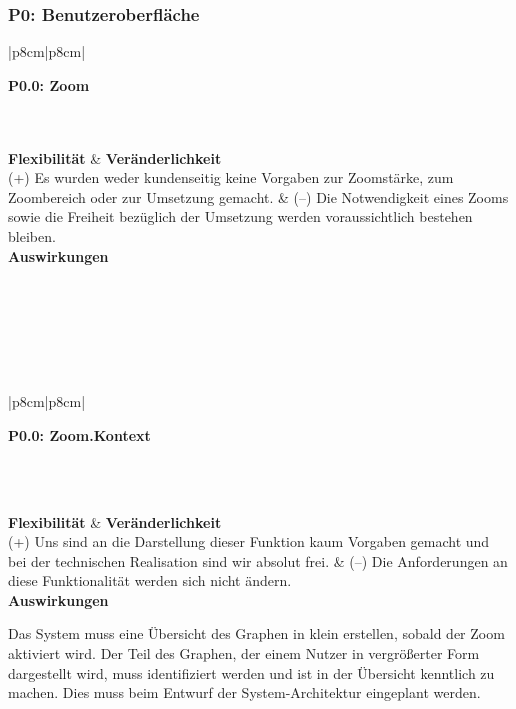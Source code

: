 \documentclass[enabledeprecatedfontcommands,fontsize=11pt,paper=a4,twoside]{scrartcl}
\newcounter{one}
\newcounter{two}[one]
\newcommand{\tone}{0\theone}
\newcommand{\one}{\stepcounter{one}0\theone}
\newcommand{\two}{\stepcounter{two}0\thetwo}
\newcommand\s{\rule{0pt}{4ex}}
\begin{document}
\subsubsection*{\hypertarget{dd}{P\one}: Benutzeroberfläche}
\begin{tabular} {|p{8cm}|p{8cm}|}
	\hline
	 {\parbox{16cm}{\textbf{\hypertarget{ee}{P\tone.\two}: Zoom}} }\\ \hline\hline
	\\ \hline
	\textbf{Flexibilität}  & \textbf{Veränderlichkeit} \\
	(+) Es wurden weder kundenseitig keine Vorgaben zur Zoomstärke, zum Zoombereich oder zur Umsetzung gemacht. &
	(--) Die Notwendigkeit eines Zooms sowie die Freiheit bezüglich der Umsetzung werden voraussichtlich bestehen bleiben. \\ \hline
	 {\textbf{Auswirkungen}} \\
	\\ \hline
\end{tabular}
\\ \\ \\ \\ %
\begin{tabular} {|p{8cm}|p{8cm}|}
	\hline
	 {\parbox{16cm}{\textbf{\hypertarget{ff}{P\tone.\two}: Zoom.Kontext}} }\\ \hline\hline
	 \s\\ [1ex] \hline
	\textbf{Flexibilität}  & \textbf{Veränderlichkeit} \\
	(+) Uns sind an die Darstellung dieser Funktion kaum Vorgaben gemacht und bei der technischen Realisation sind wir absolut frei. &
	(--) Die Anforderungen an diese Funktionalität werden sich nicht ändern. \\ \hline
	 {\textbf{Auswirkungen}} \\
	 {\parbox{16cm}{Das System muss eine Übersicht des Graphen in klein erstellen, sobald der Zoom aktiviert wird. Der Teil des Graphen, der einem Nutzer in vergrößerter Form dargestellt wird, muss identifiziert werden und ist in der Übersicht kenntlich zu machen. Dies muss beim Entwurf der System-Architektur eingeplant werden.} }\\ \hline
\end{tabular}
\end{document}
